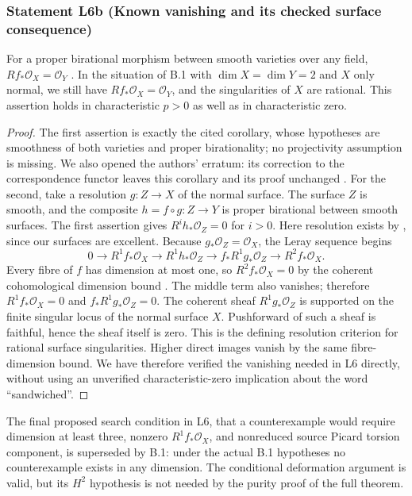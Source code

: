 \subsubsection*{Statement L6b (Known vanishing and its checked surface consequence)}
For a proper birational morphism between smooth varieties
over any field,
$Rf_*\mathcal O_X=\mathcal O_Y$
\cite[Corollary 3.2.7, p.~47 of the preprint]{ChatzistamatiouRulling2011}.
In the situation of B.1 with $\dim X=\dim Y=2$ and $X$
only normal, we still have
$Rf_*\mathcal O_X=\mathcal O_Y$, and the singularities
of $X$ are rational.  This assertion holds in characteristic
$p>0$ as well as in characteristic zero.
\begin{proof}
The first assertion is exactly the cited corollary,
whose hypotheses are smoothness of both varieties and
proper birationality; no projectivity assumption is
missing.  We also opened the authors' erratum: its correction
to the correspondence functor leaves this corollary and
its proof unchanged \cite{ChatzistamatiouRullingErratum}.
For the second, take a resolution
$g:Z\to X$ of the normal surface.  The surface $Z$ is
smooth, and the composite $h=f\circ g:Z\to Y$ is
proper birational between smooth surfaces.  The first
assertion gives $R^ih_*\mathcal O_Z=0$ for $i>0$.
Here resolution exists by \cite[Introduction, Theorem,
p.~151]{Lipman1978}, since our surfaces are excellent.
Because $g_*\mathcal O_Z=\mathcal O_X$, the Leray
sequence begins
\[
 0\longrightarrow R^1f_*\mathcal O_X
 \longrightarrow R^1h_*\mathcal O_Z
 \longrightarrow f_*R^1g_*\mathcal O_Z
 \longrightarrow R^2f_*\mathcal O_X.
\]
Every fibre of $f$ has dimension at most one, so
$R^2f_*\mathcal O_X=0$ by the coherent cohomological
dimension bound \cite[Tag 0A4T]{StacksB}.
The middle term also vanishes;
therefore $R^1f_*\mathcal O_X=0$ and
$f_*R^1g_*\mathcal O_Z=0$.  The coherent sheaf
$R^1g_*\mathcal O_Z$ is supported on the finite singular
locus of the normal surface $X$.  Pushforward of such a
sheaf is faithful, hence the sheaf itself is zero.
This is the defining resolution criterion for rational
surface singularities.  Higher direct images vanish
by the same fibre-dimension bound.  We have therefore
verified the vanishing needed in L6 directly, without
using an unverified characteristic-zero implication
about the word ``sandwiched''.
\end{proof}

The final proposed search condition in L6, that a
counterexample would require dimension at least three,
nonzero $R^1f_*\mathcal O_X$, and nonreduced source
Picard torsion component, is superseded by B.1: under
the actual B.1 hypotheses no counterexample exists in
any dimension.  The conditional deformation argument
is valid, but its $H^2$ hypothesis is not needed by the
purity proof of the full theorem.


